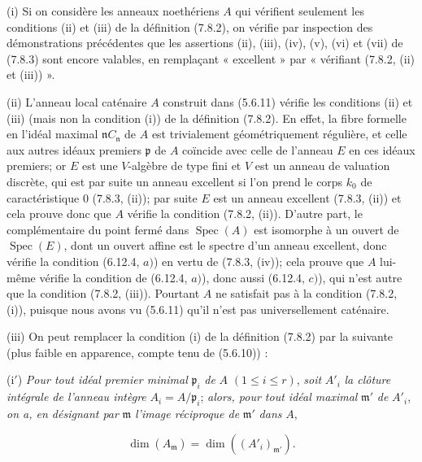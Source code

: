 \begin{remarks}[7.8.4]
\upshape
(i) Si on considère les anneaux noethériens $A$ qui vérifient seulement les
conditions (ii) et (iii) de la définition (7.8.2), on vérifie par inspection
des démonstrations précédentes que les assertions (ii), (iii), (iv), (v), (vi)
et (vii) de (7.8.3) sont encore valables, en remplaçant « excellent » par
« vérifiant (7.8.2, (ii) et (iii)) ».

(ii) L'anneau local caténaire $A$ construit dans (5.6.11) vérifie les
conditions (ii) et (iii) (mais non la condition (i)) de la définition (7.8.2).
En effet, la fibre formelle en l'idéal maximal $\mathfrak n C_{\mathfrak n}$ de
$A$ est trivialement géométriquement régulière, et celle aux autres idéaux
premiers $\mathfrak p$ de $A$ coïncide avec celle de l'anneau $E$ en ces idéaux
premiers; or $E$ est une $V$-algèbre de type fini et $V$ est un anneau de
valuation discrète, qui est par suite un anneau excellent si l'on prend le
corps $k_0$ de caractéristique $0$ (7.8.3, (ii)); par suite $E$ est un anneau
excellent (7.8.3, (ii)) et cela prouve donc que $A$ vérifie la condition (7.8.2,
(ii)). D'autre part, le complémentaire du point fermé dans
$\operatorname{Spec}(A)$ est isomorphe à un ouvert de $\operatorname{Spec}(E)$,
dont un ouvert affine est le spectre d'un anneau
excellent, donc vérifie la condition (6.12.4, $a)$) en vertu de (7.8.3, (iv));
cela prouve que $A$ lui-même vérifie la condition de (6.12.4, $a)$), donc aussi
(6.12.4, $c)$), qui n'est autre que la condition (7.8.2, (iii)). Pourtant $A$
ne satisfait pas à la condition (7.8.2, (i)), puisque nous avons vu (5.6.11)
qu'il n'est pas universellement caténaire.

(iii) On peut remplacer la condition (i) de la définition (7.8.2) par la
suivante (plus faible en apparence, compte tenu de (5.6.10)) :

(i$'$) \emph{Pour tout idéal premier minimal} $\mathfrak p_i$ \emph{de} $A$
$(1\leq i\leq r)$, \emph{soit} $A'_i$ \emph{la clôture intégrale de l'anneau
intègre} $A_i=A/\mathfrak p_i$; \emph{alors, pour tout idéal maximal}
$\mathfrak m'$ \emph{de} $A'_i$, \emph{on a, en désignant par} $\mathfrak m$
\emph{l'image réciproque de} $\mathfrak m'$ \emph{dans} $A$,
\begin{env}[7.8.4.1]
\label{IV.2.s7.8.4.1-fr}
\[
\dim(A_{\mathfrak m})=\dim((A'_i)_{\mathfrak m'}).
\]
\end{env}


\end{remarks}
